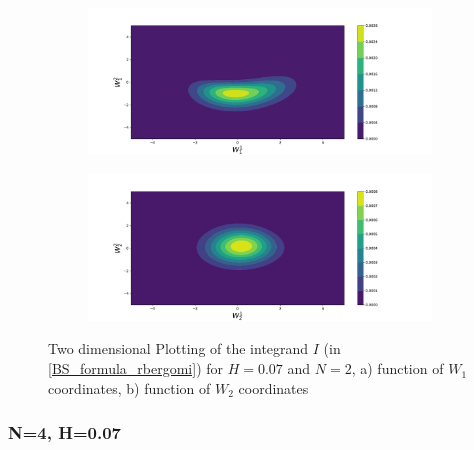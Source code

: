 \documentclass[11pt]{article}
\begin{document}
\begin{figure}[h!]
	\centering
	\begin{subfigure}{.5\textwidth}
		\centering
		\includegraphics[width=1\linewidth]{./figures/integrand_plotting_rBergomi/2D_plots/N_2/H_007/Bergomi_integrand_contours_K_1_H_007_W1_1_2_N_2}
		\caption{}
		\label{fig:sub3}
	\end{subfigure}%
	\begin{subfigure}{.5\textwidth}
		\centering
		\includegraphics[width=1\linewidth]{./figures/integrand_plotting_rBergomi/2D_plots/N_2/H_007/Bergomi_integrand_contours_K_1_H_007_W2_1_2_N_2}
		\caption{}
		\label{fig:sub4}
	\end{subfigure}
	\caption{Two dimensional Plotting of the integrand $I$ (in \eqref{BS_formula_rbergomi})  for $H=0.07$ and $N=2$, a)  function of $W_1$ coordinates, b) function of $W_2$ coordinates}
	\label{fig:Integrand_H_007_N_2_2D}
\end{figure}






\newpage
\subsubsection{N=4, H=0.07}
\end{document}
